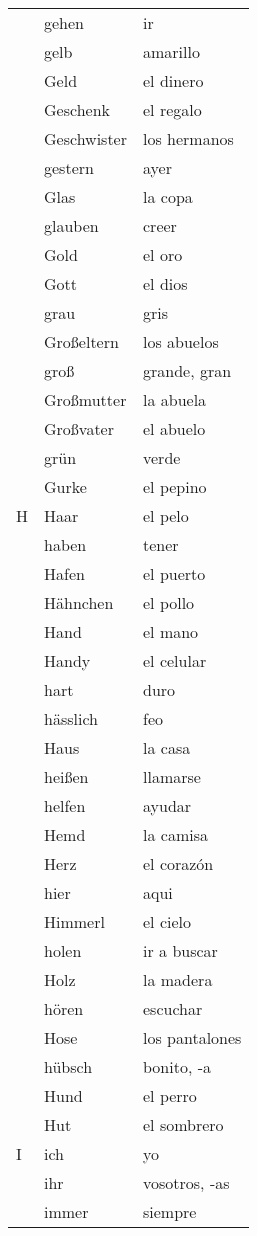 \documentclass[10pt,spanish]{article}
\begin{document}
\begin{longtable}{p{} p{} | p{}}
& gehen & ir  \\
& gelb & amarillo  \\
& Geld & el dinero  \\
& Geschenk & el regalo \\
& Geschwister & los hermanos  \\
& gestern & ayer  \\
& Glas & la copa  \\
& glauben & creer \\
& Gold & el oro \\
& Gott & el dios \\
& grau & gris  \\
& Großeltern & los abuelos  \\
& groß & grande, gran  \\
& Großmutter & la abuela  \\
& Großvater & el abuelo  \\
& grün & verde  \\
& Gurke & el pepino \\
H & Haar & el pelo  \\
& haben & tener  \\
& Hafen & el puerto  \\
& Hähnchen & el pollo  \\
& Hand & el mano  \\
& Handy & el celular  \\
& hart & duro  \\
& hässlich & feo \\
& Haus & la casa  \\
& heißen & llamarse \\
& helfen & ayudar  \\
& Hemd & la camisa  \\
& Herz & el corazón \\
& hier & aqui  \\
& Himmerl & el cielo  \\
& holen & ir a buscar  \\
& Holz & la madera  \\
& hören & escuchar \\
& Hose & los pantalones  \\
& hübsch & bonito, -a \\
& Hund & el perro  \\
& Hut & el sombrero  \\
I & ich & yo  \\
& ihr & vosotros, -as\\
& immer & siempre  \\

\end{longtable}
\end{document}
